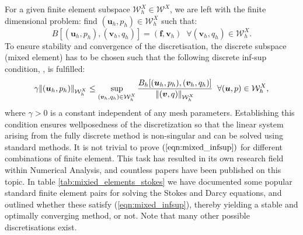 For a given finite element subspace $\mathcal{W}^{X}_{h} \in \mathcal{W}^{X}$, we are left with the finite dimensional problem: find $(\boldsymbol{u}_{h},p_{h})\in \mathcal{W}^{X}_{h}$ such that:
%
\begin{equation*}
B[(\boldsymbol{u}_{h},p_{h}),(\boldsymbol{v}_{h},q_{h})]= (\boldsymbol{f},\boldsymbol{v}_{h}) \;\; \forall (\boldsymbol{v}_{h},q_{h}) \in \mathcal{W}^{X}_{h}.
\label{eqn:mixed_disc}
\end{equation*}
%
%
%
%
To ensure stability and convergence of the discretisation, the discrete subspace (mixed element) has to be chosen such that the following discrete inf-sup condition, \citep{babuvska1971error}, is fulfilled:   
\begin{equation}
  \gamma {\left\vert\kern-0.25ex\left\vert (\boldsymbol{u}_{h},p_{h}) \right\vert\kern-0.25ex\right\vert}_{\mathcal{W}^{X}_{h}} \leq \sup_{(\boldsymbol{v}_{h},q_{h})\in \mathcal{W}^{X}_{h}}\frac{B_{h}[(\boldsymbol{u}_{h},p_{h}),(\boldsymbol{v}_{h},q_{h})]}{{\left\vert\kern-0.25ex\left\vert (\boldsymbol{v},q) \right\vert\kern-0.25ex\right\vert}_{\mathcal{W}^{X}_{h}}} \;\; \forall (\boldsymbol{u},p) \in \mathcal{W}^{X}_{h},
\label{eqn:mixed_infsup}
\end{equation}
where $\gamma>0$ is a constant independent of any mesh parameters. Establishing this condition ensures wellposedness of the discretization so that the linear system arising from the fully discrete method is non-singular and can be solved using standard methods. It is not trivial to prove $(\ref{eqn:mixed_infsup})$ for different combinations of finite element. This task has resulted in its own research field within Numerical Analysis, and countless papers have been published on this topic. In table \ref{tab:mixied_elements_stokes} we have documented some popular standard finite element pairs for solving the Stokes and Darcy equations, and outlined whether these satisfy (\ref{eqn:mixed_infsup}), thereby yielding a stable and optimally converging method, or not. Note that many other possible discretisations exist.
